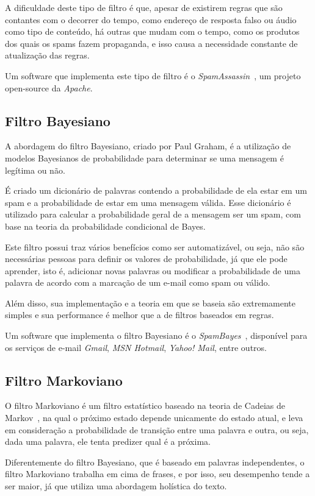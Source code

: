 \documentclass[a4paper,dvipdfm]{article}
\begin{document}
		A dificuldade deste tipo de filtro é que, apesar de existirem regras que são contantes com o decorrer do tempo, como endereço de resposta falso ou áudio como tipo de conteúdo, há outras que mudam com o tempo, como os produtos dos quais os spams fazem propaganda, e isso causa a necessidade constante de atualização das regras.

		Um software que implementa este tipo de filtro é o \emph{SpamAssassin}~\cite{spamassassin}, um projeto open-source da \emph{Apache}.

	\subsection{Filtro Bayesiano}
		A abordagem do filtro Bayesiano, criado por Paul Graham, é a utilização de modelos Bayesianos de probabilidade para determinar se uma mensagem é legítima ou não.

		É criado um dicionário de palavras contendo a probabilidade de ela estar em um spam e a probabilidade de estar em uma mensagem válida. Esse dicionário é utilizado para calcular a probabilidade geral de a mensagem ser um spam, com base na teoria da probabilidade condicional de Bayes.

		Este filtro possui traz vários benefícios como ser automatizável, ou seja, não são necessárias pessoas para definir os valores de probabilidade, já que ele pode aprender, isto é, adicionar novas palavras ou modificar a probabilidade de uma palavra de acordo com a marcação de um e-mail como spam ou válido.

		Além disso, sua implementação e a teoria em que se baseia são extremamente simples e sua performance é melhor que a de filtros baseados em regras.
		
		Um software que implementa o filtro Bayesiano é o \emph{SpamBayes}~\cite{spambayes}, disponível para os serviços de e-mail \emph{Gmail}, \emph{MSN Hotmail}, \emph{Yahoo! Mail}, entre outros.

	\subsection{Filtro Markoviano}
		O filtro Markoviano é um filtro estatístico baseado na teoria de Cadeias de Markov~\cite{markov}, na qual o próximo estado depende unicamente do estado atual, e leva em consideração a probabilidade de transição entre uma palavra e outra, ou seja, dada uma palavra, ele tenta predizer qual é a próxima.

		Diferentemente do filtro Bayesiano, que é baseado em palavras independentes, o filtro Markoviano trabalha em cima de frases, e por isso, seu desempenho tende a ser maior, já que utiliza uma abordagem holística do texto.
		
\end{document}
